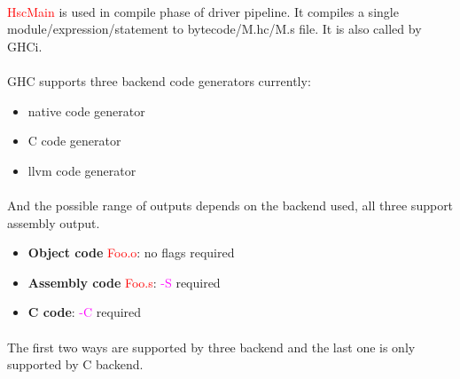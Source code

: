 \documentclass{article}
\begin{document}
	\paragraph{}
	\textcolor{red}{HscMain} is used in compile phase of driver pipeline. It compiles a single module/expression/statement to bytecode/M.hc/M.s file. It is also called by GHCi.
	\paragraph{}
	GHC supports three backend code generators currently:
	\begin{itemize}
		\item native code generator
		\item C code generator
		\item llvm code generator
	\end{itemize}
	\paragraph{}
	And the possible range of outputs depends on the backend used, all three support assembly output.
	\begin{itemize}
		\item \textbf{Object code} \textcolor{red}{Foo.o}: no flags required
		\item \textbf{Assembly code} \textcolor{red}{Foo.s}: \textcolor{magenta}{-S} required
		\item \textbf{C code}: \textcolor{magenta}{-C} required
	\end{itemize}
	\paragraph{}
	The first two ways are supported by three backend and the last one is only supported by C backend.
\end{document}
